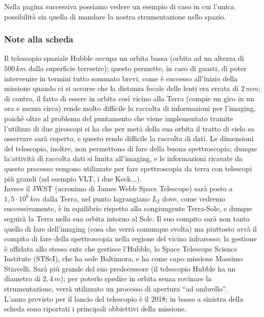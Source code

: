 Nella pagina successiva possiamo vedere un esempio di caso in cui l'unica possibilità  sia quella di mandare la nostra strumentazione nello spazio.

\subsubsection{Note alla scheda}
Il telescopio spaziale Hubble occupa un orbita bassa (orbita ad un altezza di $500 \, km$ dalla superficie terrestre); questo permette, in caso di guasti, di poter intervenire in termini tutto sommato brevi, come è successo all'inizio della missione quando ci si accorse che la distanza focale delle lenti era errata di $2 \, mm$; di contro, il fatto di essere in orbita così vicino alla Terra (compie un giro in un ora e mezza circa) rende molto difficile la raccolta di informazioni per l'imaging, poichè oltre al problema del puntamento che viene implementato tramite l'utilizzo di due giroscopi si ha che per metà della sua orbita il tratto di cielo sa osservare sarà coperto, e questo rende difficile la raccolta di dati. Le dimensioni del telescopio, inoltre, non permettono di fare della buona spettroscopia; dunque la'attività di raccolta dati si limita all'imaging, e le informazioni ricavate da questo processo vengono utilizzate per fare spettroscopia da terra con telescopi più grandi (ad esempio VLT, i due Keck...).\\
Invece il JWST (acronimo di James Webb Space Telescope) sarà posto a $1,5 \cdot 10^6 \, km$ dalla Terra, nel punto lagrangiano $L_2$ dove, come vedremo successivamente, è in equilibrio rispetto alla congiungente Terra-Sole, e  dunque seguirà la Terra nella sua orbita intorno al Sole. Il suo compito sarà non tanto quello di fare dell'imaging (cosa che verrà comunque svolta) ma piuttosto avrà il compito di fare della spettroscopia nella regione del vicino infrarosso; la gestione è affidata allo stesso ente che gestisce l'Hubble, lo Space Telescope Science Institute (STScI), che ha sede  Baltimora, e ha come capo missione Massimo Stiavelli. Sarà più grande del suo predecessore (il telescopio Hubble ha un diametro di $2,4 \, m$); per poterlo spedire in orbita senza rovinare la strumentazione, verrà utilizzato un processo di apertura ``ad ombrello''.\\
L'anno previsto per il lancio del telescopio è il 2018; in basso a sinistra della scheda sono riportati i principali obbiettivi della missione.

\clearpage


